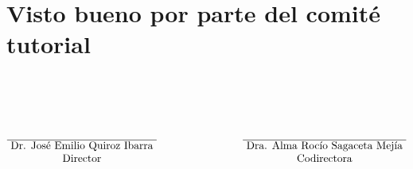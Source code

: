 \newpage
\section {Visto bueno por parte del comité tutorial}
\[\begin{matrix}\centering
&&\\&&\\&&\\&&\\&&\\
\overline{\ \text{Dr. José Emilio Quiroz Ibarra}\ }&\qquad\qquad\qquad&\overline{\ \text{Dra. Alma Rocío Sagaceta Mejía}\ }\\
\text{Director}&&\text{Codirectora}
\end{matrix}\]